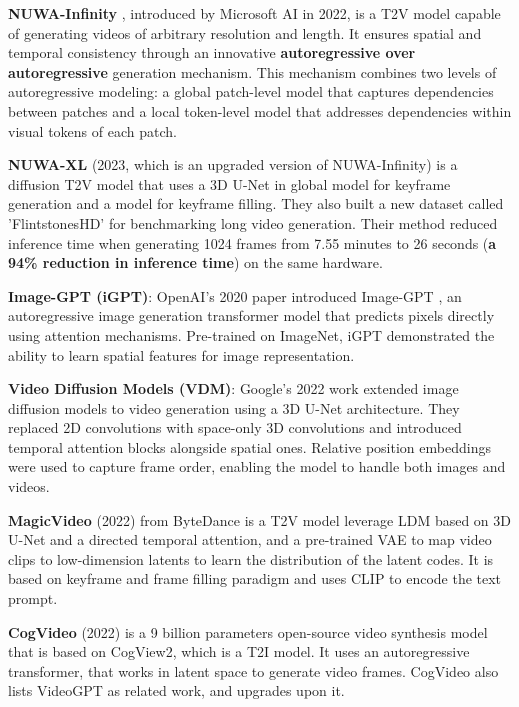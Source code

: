 \textbf{NUWA-Infinity } \cite{nuwa_infinity}, introduced by Microsoft AI in 2022, is a T2V model capable of generating videos of arbitrary resolution and length. It ensures spatial and temporal consistency through an innovative \textbf{autoregressive over autoregressive} generation mechanism. This mechanism combines two levels of autoregressive modeling: a global patch-level model that captures dependencies between patches and a local token-level model that addresses dependencies within visual tokens of each patch.

\textbf{NUWA-XL} \cite{nuwa_xl} (2023, which is an upgraded version of NUWA-Infinity) is a diffusion T2V model that uses a 3D U-Net in global model for keyframe generation and a model for keyframe filling. They also built a new dataset called 'FlintstonesHD' for benchmarking long video generation. Their method reduced inference time when generating 1024 frames from 7.55 minutes to 26 seconds (\textbf{a 94\% reduction in inference time}) on the same hardware.

\textbf{Image-GPT (iGPT)}: OpenAI's 2020 paper introduced Image-GPT \cite{imagegpt}, an autoregressive image generation transformer model that predicts pixels directly using attention mechanisms. Pre-trained on ImageNet, iGPT demonstrated the ability to learn spatial features for image representation.

\textbf{Video Diffusion Models (VDM)}: Google's 2022 work \cite{video_diffusion_models} extended image diffusion models to video generation using a 3D U-Net architecture. They replaced 2D convolutions with space-only 3D convolutions and introduced temporal attention blocks alongside spatial ones. Relative position embeddings were used to capture frame order, enabling the model to handle both images and videos.

\textbf{MagicVideo} (2022) \cite{magic_video} from ByteDance is a T2V model leverage LDM based on 3D U-Net and a directed temporal attention, and a pre-trained VAE to map video clips to low-dimension latents to learn the distribution of the latent codes. It is based on keyframe and frame filling paradigm and uses CLIP to encode the text prompt.

\textbf{CogVideo} (2022) \cite{cogvideo} is a 9 billion parameters open-source video synthesis model that is based on CogView2, which is a T2I model. It uses an autoregressive transformer, that works in latent space to generate video frames. CogVideo also lists VideoGPT as related work, and upgrades upon it.

